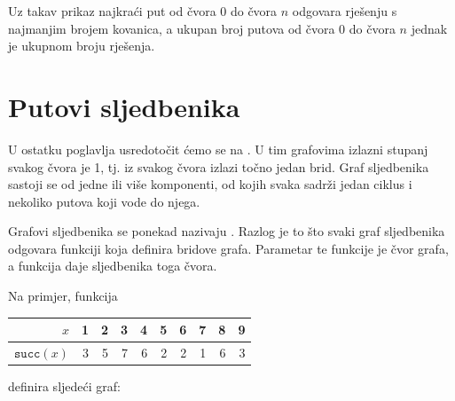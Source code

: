 Uz takav prikaz
najkraći put od čvora 0 do čvora $n$
odgovara rješenju s najmanjim brojem kovanica,
a ukupan broj putova od čvora 0 do čvora $n$
jednak je ukupnom broju rješenja.

\section{Putovi sljedbenika}


U ostatku poglavlja
usredotočit ćemo se na .
U tim grafovima
izlazni stupanj svakog čvora je 1, tj.
iz svakog čvora izlazi točno jedan brid.
Graf sljedbenika sastoji se od jedne ili više
komponenti, od kojih svaka sadrži
jedan ciklus i nekoliko putova koji vode do njega.

Grafovi sljedbenika se ponekad nazivaju
.
Razlog je to što svaki graf sljedbenika
odgovara funkciji koja definira
bridove grafa.
Parametar te funkcije je čvor grafa,
a funkcija daje sljedbenika toga čvora.

Na primjer, funkcija
\begin{center}
\begin{tabular}{r|rrrrrrrrr}
$x$ & 1 & 2 & 3 & 4 & 5 & 6 & 7 & 8 & 9 \\
\hline
$\texttt{succ}(x)$ & 3 & 5 & 7 & 6 & 2 & 2 & 1 & 6 & 3 \\
\end{tabular}
\end{center}
definira sljedeći graf:
\begin{center}
\end{center}

